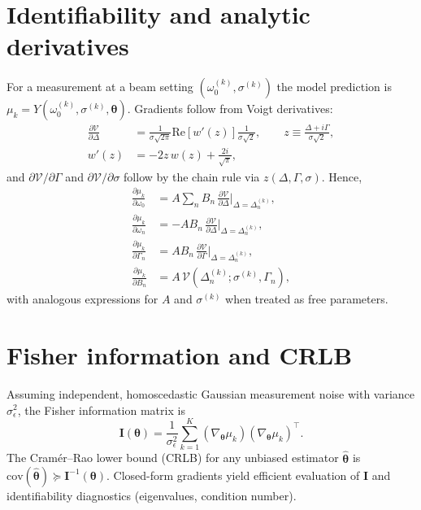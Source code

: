 \documentclass[aps,prb,amsmath,amssymb]{revtex4-2} %
\begin{document}
    \section{Identifiability and analytic derivatives}
        For a measurement at a beam setting $(\omega_0^{(k)},\sigma^{(k)})$ the model prediction is
        $\mu_k=Y\left(\omega_0^{(k)},\sigma^{(k)},\boldsymbol{\theta}\right)$. Gradients follow from Voigt derivatives:
        \begin{align}
            \frac{\partial \mathcal{V}}{\partial \Delta} &= \frac{1}{\sigma\sqrt{2\pi}}\mathrm{Re}\left[w'\left(z\right)\right]\frac{1}{\sigma\sqrt{2}},\qquad
            z\equiv \frac{\Delta+i\Gamma}{\sigma\sqrt{2}},\\
            w'(z) &= -2 z\,w(z)+\frac{2i}{\sqrt{\pi}},
        \end{align}
        and $\partial \mathcal{V}/\partial \Gamma$ and $\partial \mathcal{V}/\partial \sigma$ follow by the chain rule
        via $z(\Delta,\Gamma,\sigma)$. Hence,
        \begin{align}
            \frac{\partial \mu_k}{\partial \omega_0} &= A\sum_n B_n\,\frac{\partial \mathcal{V}}{\partial \Delta}\Big|_{\Delta=\Delta_n^{(k)}},\\
            \frac{\partial \mu_k}{\partial \omega_n} &= -A B_n\,\frac{\partial \mathcal{V}}{\partial \Delta}\Big|_{\Delta=\Delta_n^{(k)}},\\
            \frac{\partial \mu_k}{\partial \Gamma_n} &= A B_n\,\frac{\partial \mathcal{V}}{\partial \Gamma}\Big|_{\Delta=\Delta_n^{(k)}},\\
            \frac{\partial \mu_k}{\partial B_n} &= A\,\mathcal{V}\left(\Delta_n^{(k)};\sigma^{(k)},\Gamma_n\right),
        \end{align}
        with analogous expressions for $A$ and $\sigma^{(k)}$ when treated as free parameters.

    \section{Fisher information and CRLB}
        Assuming independent, homoscedastic Gaussian measurement noise with variance $\sigma_\epsilon^2$,
        the Fisher information matrix is
        \begin{equation}
            \mathbf{I}(\boldsymbol{\theta}) = \frac{1}{\sigma_\epsilon^2}\sum_{k=1}^{K}
            \left(\nabla_{\!\boldsymbol{\theta}} \mu_k\right)\left(\nabla_{\!\boldsymbol{\theta}} \mu_k\right)^{\top}.
        \end{equation}
        The Cram\'er--Rao lower bound (CRLB) for any unbiased estimator $\hat{\boldsymbol{\theta}}$ is
        $\mathrm{cov}(\hat{\boldsymbol{\theta}}) \succeq \mathbf{I}^{-1}(\boldsymbol{\theta})$. Closed-form gradients yield
        efficient evaluation of $\mathbf{I}$ and identifiability diagnostics (eigenvalues, condition number).
\end{document}
